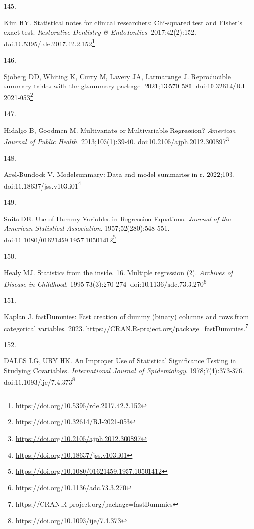 \documentclass[
  a4paper,
]{book}
\newlength{\cslhangindent}
\newlength{\csllabelwidth}
\newlength{\cslentryspacingunit} %
\newenvironment{CSLReferences}[2] %
 {%
  \setlength{\parindent}{0pt}
  \ifodd #1
  \let\oldpar\par
  \def\par{\hangindent=\cslhangindent\oldpar}
  \fi
  \setlength{\parskip}{#2\cslentryspacingunit}
 }%
 {}
\newcommand{\CSLLeftMargin}[1]{\parbox[t]{\csllabelwidth}{#1}}
\newcommand{\CSLRightInline}[1]{\parbox[t]{\linewidth - \csllabelwidth}{#1}\break}
\renewcommand{\href}[2]{#2\footnote{\url{#1}}}
\begin{document}
\begin{CSLReferences}{0}{0}
\leavevmode{}%
\CSLLeftMargin{145. }%
\CSLRightInline{Kim HY. Statistical notes for clinical researchers: Chi-squared test and Fisher's exact test. \emph{Restorative Dentistry \& Endodontics}. 2017;42(2):152. doi:\href{https://doi.org/10.5395/rde.2017.42.2.152}{10.5395/rde.2017.42.2.152}}

\leavevmode{}%
\CSLLeftMargin{146. }%
\CSLRightInline{Sjoberg DD, Whiting K, Curry M, Lavery JA, Larmarange J. Reproducible summary tables with the gtsummary package. 2021;13:570-580. doi:\href{https://doi.org/10.32614/RJ-2021-053}{10.32614/RJ-2021-053}}

\leavevmode{}%
\CSLLeftMargin{147. }%
\CSLRightInline{Hidalgo B, Goodman M. Multivariate or Multivariable Regression? \emph{American Journal of Public Health}. 2013;103(1):39-40. doi:\href{https://doi.org/10.2105/ajph.2012.300897}{10.2105/ajph.2012.300897}}

\leavevmode{}%
\CSLLeftMargin{148. }%
\CSLRightInline{Arel-Bundock V. {\textbraceleft}Modelsummary{\textbraceright}: Data and model summaries in {\textbraceleft}r{\textbraceright}. 2022;103. doi:\href{https://doi.org/10.18637/jss.v103.i01}{10.18637/jss.v103.i01}}

\leavevmode{}%
\CSLLeftMargin{149. }%
\CSLRightInline{Suits DB. Use of Dummy Variables in Regression Equations. \emph{Journal of the American Statistical Association}. 1957;52(280):548-551. doi:\href{https://doi.org/10.1080/01621459.1957.10501412}{10.1080/01621459.1957.10501412}}

\leavevmode{}%
\CSLLeftMargin{150. }%
\CSLRightInline{Healy MJ. Statistics from the inside. 16. Multiple regression (2). \emph{Archives of Disease in Childhood}. 1995;73(3):270-274. doi:\href{https://doi.org/10.1136/adc.73.3.270}{10.1136/adc.73.3.270}}

\leavevmode{}%
\CSLLeftMargin{151. }%
\CSLRightInline{Kaplan J. fastDummies: Fast creation of dummy (binary) columns and rows from categorical variables. 2023. \href{https://CRAN.R-project.org/package=fastDummies}{https://CRAN.R-project.org/package=fastDummies.}}

\leavevmode{}%
\CSLLeftMargin{152. }%
\CSLRightInline{DALES LG, URY HK. An Improper Use of Statistical Significance Testing in Studying Covariables. \emph{International Journal of Epidemiology}. 1978;7(4):373-376. doi:\href{https://doi.org/10.1093/ije/7.4.373}{10.1093/ije/7.4.373}}


\end{CSLReferences}
\end{document}
